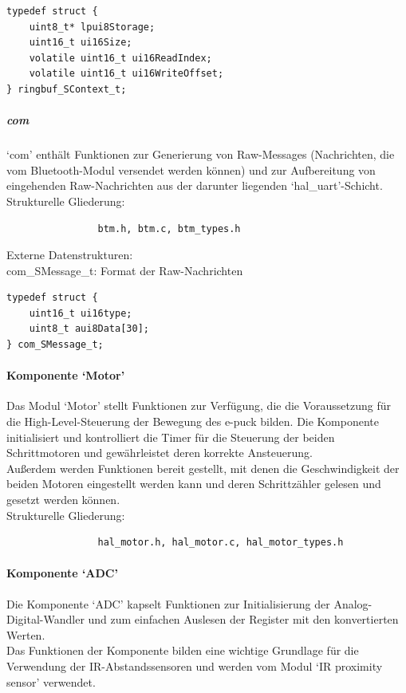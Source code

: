 \documentclass[10pt,a4paper]{article}
\begin{document}
				\lstset{language = C, tabsize = 4}
				\begin{lstlisting}[frame = single]
typedef struct {
	uint8_t* lpui8Storage;
	uint16_t ui16Size;
	volatile uint16_t ui16ReadIndex;
	volatile uint16_t ui16WriteOffset;
} ringbuf_SContext_t;
				\end{lstlisting}
				
				\subparagraph*{com}
				`com' enthält Funktionen zur Generierung von Raw-Messages (Nachrichten, die vom Bluetooth-Modul versendet werden
				können) und zur Aufbereitung von eingehenden Raw-Nachrichten aus der darunter liegenden `hal\_uart'-Schicht. \\
				
				Strukturelle Gliederung:
				\begin{verbatim}  
				btm.h, btm.c, btm_types.h
				\end{verbatim}
				
				Externe Datenstrukturen: \\
				com\_SMessage\_t: Format der Raw-Nachrichten
				
				\lstset{language = C, tabsize = 4}
				\begin{lstlisting}[frame = single]
typedef struct {
	uint16_t ui16type;
	uint8_t aui8Data[30];
} com_SMessage_t;
				\end{lstlisting}
				
			\paragraph*{Komponente `Motor'}
			Das Modul `Motor' stellt Funktionen zur Verfügung, die die Voraussetzung für die High-Level-Steuerung der Bewegung des e-puck bilden.
			Die Komponente initialisiert und kontrolliert die Timer für die Steuerung der beiden Schrittmotoren und gewährleistet deren korrekte
			Ansteuerung. \\
			Außerdem werden Funktionen bereit gestellt, mit denen die Geschwindigkeit der beiden Motoren eingestellt werden kann und deren
			Schrittzähler gelesen und gesetzt werden können. \\
			
			Strukturelle Gliederung:
				\begin{verbatim}  
				hal_motor.h, hal_motor.c, hal_motor_types.h
				\end{verbatim}
						
			\paragraph*{Komponente `ADC'}
			Die Komponente `ADC' kapselt Funktionen zur Initialisierung der Analog-Digital-Wandler und zum einfachen Auslesen der Register
			mit den konvertierten Werten. \\
			Das Funktionen der Komponente bilden eine wichtige Grundlage für die Verwendung der IR-Abstandssensoren und werden vom Modul `IR 
			proximity sensor' verwendet.
			
\end{document}
